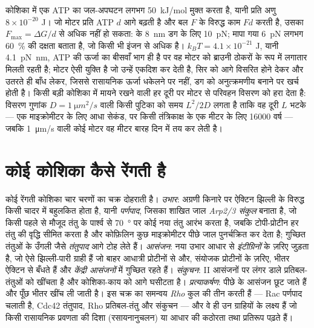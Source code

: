 \begin{proposition}[भौतिकी किसी मोटर को क्या देती है]\label{prop:b3:cytoskeleton-motility:physics}
कोशिका में एक ATP का जल-अपघटन लगभग \qty{50}{kJ/mol} मुक्त करता है,
यानी प्रति अणु $8\times 10^{-20}$ J। जो मोटर प्रति ATP $d$ आगे बढ़ती है
और बल $F$ के विरुद्ध काम $Fd$ करती है, उसका \emph{}
$F_{\max} = \Delta G/d$ से अधिक नहीं हो सकता:  के \qty{8}{nm}
डग के लिए \qty{10}{pN}; मापा गया \qty{6}{pN} लगभग \qty{60}{\%} की
दक्षता बताता है, जो किसी भी इंजन से अधिक है।  $k_{B}T =
4.1\times 10^{-21}$ J, यानी \qty{4.1}{pN.nm}, ATP की ऊर्जा का बीसवाँ भाग
ही है पर वह मोटर को ब्राउनी ठोकरों के रूप में लगातार मिलती रहती है;
मोटर ऐसी युक्ति है जो उन्हें एकदिश कर देती है, सिर को आगे विसरित होने
देकर और उतरते ही बाँध लेकर, जिससे रासायनिक ऊर्जा धकेलने पर नहीं, डग को
अनुत्क्रमणीय बनाने पर खर्च होती है। किसी बड़ी कोशिका में मायने रखने
वाली हर दूरी पर मोटर से परिवहन विसरण को हरा देता है: विसरण गुणांक
$D = \qty{1}{\micro
m^2/s}$ वाली किसी पुटिका को समय $L^{2}/2D$ लगता है ताकि वह दूरी $L$ भटके
--- एक माइक्रोमीटर के लिए आधा सेकंड, पर किसी तंत्रिकाक्ष के एक मीटर के
लिए \num{16000} वर्ष --- जबकि \qty{1}{\micro m/s} वाली कोई मोटर वह मीटर
बारह दिन में तय कर लेती है।
\end{proposition}
\admitted

\section{कोई कोशिका कैसे रेंगती है}

\begin{definition}[कोशिका प्रवसन]\label{def:b3:cytoskeleton-motility:migration}
कोई रेंगती कोशिका चार चरणों का चक्र दोहराती है। \emph{उभार}: अग्रणी
किनारे पर ऐक्टिन झिल्ली के विरुद्ध किसी चादर में बहुलकित होता है, यानी
\emph{पर्णपाद}, जिसका शाखित जाल \emph{Arp2/3 संकुल} बनाता है, जो किसी
पहले से मौजूद तंतु के पार्श्व से \qty{70}{\degree} पर कोई नया तंतु
आरंभ करता है, जबकि टोपी-प्रोटीन हर तंतु की वृद्धि सीमित करता है और
कोफ़िलिन कुछ माइक्रोमीटर पीछे जाल पुनर्चक्रित कर देता है; गुच्छित
तंतुओं के उँगली जैसे \emph{तंतुपाद} आगे टोह लेते हैं।
\emph{आसंजन}: नया उभार आधार से \emph{इंटीग्रिनों} के ज़रिए जुड़ता है,
जो ऐसे झिल्ली-पारी ग्राही हैं जो बाहर आधात्री प्रोटीनों से और, संयोजक
प्रोटीनों के ज़रिए, भीतर ऐक्टिन से बँधते हैं और \emph{केंद्री आसंजनों}
में गुच्छित रहते हैं। \emph{संकुचन}:  II आसंजनों पर लंगर डाले
प्रतिबल-तंतुओं को खींचता है और कोशिका-काय को आगे घसीटता है।
\emph{प्रत्याकर्षण}: पीछे के आसंजन छूट जाते हैं और पूँछ भीतर खींच ली
जाती है। इस चक्र का समन्वय \emph{Rho} कुल की तीन  करती हैं
--- Rac पर्णपाद चलाती है, Cdc42 तंतुपाद, Rho प्रतिबल-तंतु और संकुचन ---
और वे ही उन ग्राहियों के लक्ष्य हैं जो किसी रासायनिक प्रवणता की दिशा
(रसायनानुचलन) या आधार की कठोरता तथा प्रतिरूप पढ़ते हैं।
\end{definition}

